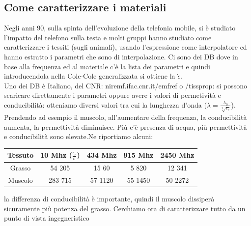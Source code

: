 \documentclass[oneside, 12pt]{extbook}
\begin{document}
\subsection{Come caratterizzare i materiali}
Negli anni 90, sulla spinta dell'evoluzione della telefonia mobile, si è studiato l'impatto del telefono sulla testa e molti gruppi hanno studiato come caratterizzare i tessiti (sugli animali), usando l'espressione come interpolatore ed hanno estratto i parametri che sono di interpolazione. Ci sono dei DB dove in base alla frequenza ed al materiale c'è la lista dei parametri e quindi introducendola nella Cole-Cole generalizzata si ottiene la $\dot\epsilon$.\\Uno dei DB è Italiano, del CNR: niremf.ifac.cnr.it/emfref o /tissprop: si possono scaricare direttamente i parametri oppure avere i valori di permetività e conducibilità: otteniamo diversi valori tra cui la lunghezza d'onda ($\lambda = \frac{\lambda_0}{\sqrt[2]{\epsilon_r}}$). Prendendo ad esempio il muscolo, all'aumentare della frequenza, la conducibilità aumenta, la permettività diminuisce. Più c'è presenza di acqua, più permettività e conducibilità sono elevate.Ne riportiamo alcuni:
\begin{table}
    \begin{tabular}{c|c|c|c|c}
        Tessuto & 10 Mhz ($\frac{\epsilon_r}{\sigma}$) & 434 Mhz & 915 Mhz & 2450 Mhz\\
        \hline
        Grasso & 54 205 & 15 60 & 5 820 & 12 341\\
        Muscolo & 283 715 & 57 1120 & 55 1450 & 50 2272\\
    \end{tabular}
\end{table}
la differenza di conducibilità è importante, quindi il muscolo dissiperà sicuramente più potenza del grasso.
Cerchiamo ora di caratterizzare tutto da un punto di vista ingegneristico
\end{document}
